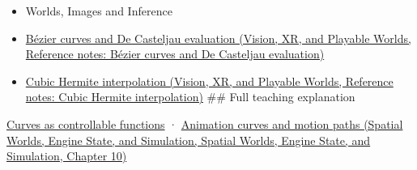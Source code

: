 \begin{itemize}
\item
  {Worlds, Images and Inference}
\item
  \href{../07-Vision-XR-and-Playable-Worlds/main.pdf\#nameddest=appendix-ddbec701898c}{Bézier curves and De Casteljau evaluation (Vision, XR, and Playable Worlds, Reference notes: Bézier curves and De Casteljau evaluation)}
\item
  \href{../07-Vision-XR-and-Playable-Worlds/main.pdf\#nameddest=appendix-db3aef8f2fd6}{Cubic Hermite interpolation (Vision, XR, and Playable Worlds, Reference notes: Cubic Hermite interpolation)} \#\# Full teaching explanation
\end{itemize}

\hyperref[03-visual-computing-i-ch001-curves-as-controllable-functions]{Curves as controllable functions} · \href{../05-Spatial-Worlds-Engine-State-and-Simulation/main.pdf\#nameddest=04-visual-computing-ii-ch029-animation-curves-and-motion-paths}{Animation curves and motion paths (Spatial Worlds, Engine State, and Simulation, Spatial Worlds, Engine State, and Simulation, Chapter 10)}
